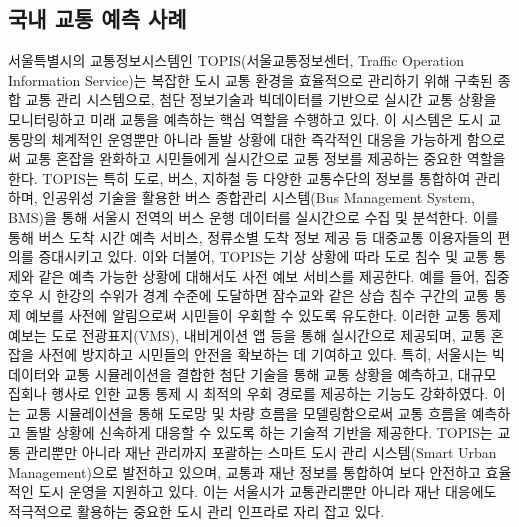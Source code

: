 \documentclass[11pt]{report}
\begin{document}
\subsection{국내 교통 예측 사례}
서울특별시의 교통정보시스템인 TOPIS(서울교통정보센터, Traffic Operation Information Service)는 복잡한 도시 교통 환경을 효율적으로 관리하기 위해 구축된 종합 교통 관리 시스템으로, 첨단 정보기술과 빅데이터를 기반으로 실시간 교통 상황을 모니터링하고 미래 교통을 예측하는 핵심 역할을 수행하고 있다. 이 시스템은 도시 교통망의 체계적인 운영뿐만 아니라 돌발 상황에 대한 즉각적인 대응을 가능하게 함으로써 교통 혼잡을 완화하고 시민들에게 실시간으로 교통 정보를 제공하는 중요한 역할을 한다. %
TOPIS는 특히 도로, 버스, 지하철 등 다양한 교통수단의 정보를 통합하여 관리하며, 인공위성 기술을 활용한 버스 종합관리 시스템(Bus Management System, BMS)을 통해 서울시 전역의 버스 운행 데이터를 실시간으로 수집 및 분석한다. 
이를 통해 버스 도착 시간 예측 서비스, 정류소별 도착 정보 제공 등 대중교통 이용자들의 편의를 증대시키고 있다. %
이와 더불어, TOPIS는 기상 상황에 따라 도로 침수 및 교통 통제와 같은 예측 가능한 상황에 대해서도 사전 예보 서비스를 제공한다. 예를 들어, 집중호우 시 한강의 수위가 경계 수준에 도달하면 잠수교와 같은 상습 침수 구간의 교통 통제 예보를 사전에 알림으로써 시민들이 우회할 수 있도록 유도한다. 이러한 교통 통제 예보는 도로 전광표지(VMS), 내비게이션 앱 등을 통해 실시간으로 제공되며, 교통 혼잡을 사전에 방지하고 시민들의 안전을 확보하는 데 기여하고 있다. %
특히, 서울시는 빅데이터와 교통 시뮬레이션을 결합한 첨단 기술을 통해 교통 상황을 예측하고, 대규모 집회나 행사로 인한 교통 통제 시 최적의 우회 경로를 제공하는 기능도 강화하였다. 이는 교통 시뮬레이션을 통해 도로망 및 차량 흐름을 모델링함으로써 교통 흐름을 예측하고 돌발 상황에 신속하게 대응할 수 있도록 하는 기술적 기반을 제공한다. %
TOPIS는 교통 관리뿐만 아니라 재난 관리까지 포괄하는 스마트 도시 관리 시스템(Smart Urban Management)으로 발전하고 있으며, 교통과 재난 정보를 통합하여 보다 안전하고 효율적인 도시 운영을 지원하고 있다. 이는 서울시가 교통관리뿐만 아니라 재난 대응에도 적극적으로 활용하는 중요한 도시 관리 인프라로 자리 잡고 있다. %
\end{document}
